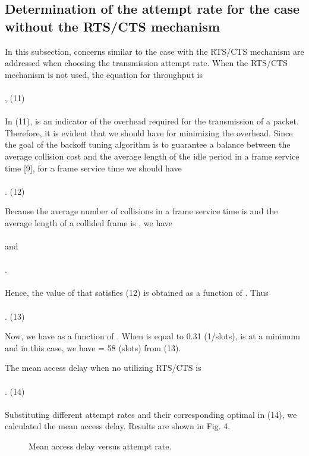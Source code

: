\documentclass[10pt,twocolumn,oneside,submit]{JCNtran}
\begin{document}
\subsection{Determination of the attempt rate for the case without the RTS/CTS mechanism}
\par In this subsection, concerns similar to the case with the RTS/CTS mechanism are addressed when choosing the transmission attempt rate. When the RTS/CTS mechanism is not used, the equation for throughput is\\
\\
, \hfill(11) \\
\\
In (11),  is an indicator of the overhead required for the transmission of a packet. Therefore, it is evident that we should have  for minimizing the overhead. Since the goal of the backoff tuning algorithm is to guarantee a balance between the average collision cost  and the average length of the idle period  in a frame service time [9], for a frame service time we should have\\
\\
. \hfill(12) \\
\par Because the average number of collisions in a frame service time is  and the average length of a collided frame is , we have\\
\\
 and\\
\\
.\\
\\
Hence, the value of  that satisfies (12) is obtained as a function of . Thus\\
\\
. \hfill(13) \\
\par Now, we have  as a function of . When  is equal to 0.31 (1/slots),  is at a minimum and in this case, we have  = 58 (slots) from (13).
\par The mean access delay when no utilizing RTS/CTS is\\
\\
. \hfill(14) \\
\\
Substituting different attempt rates and their corresponding optimal  in (14), we calculated the mean access delay. Results are shown in Fig. 4.
\begin{figure}[t]
\begin{center}
\epsfxsize=8cm \leavevmode{} \caption{Mean access delay versus attempt rate.} \label{fig:4}
\end{center}
\end{figure}
\end{document}
